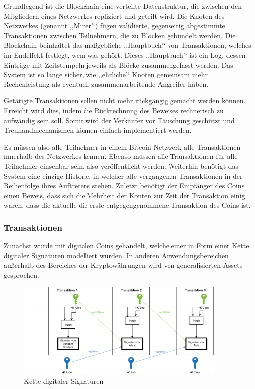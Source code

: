     \noindent Grundlegend ist die Blockchain eine verteilte Datenstruktur, die zwischen den Mitgliedern eines Netzwerkes repliziert und geteilt wird\cite{Christidis2016}.
    Die Knoten des Netzwerkes (genannt ,,Miner'`) fügen validierte, gegenseitig abgestimmte Transaktionen zwischen Teilnehmern, die zu Blöcken gebündelt werden.
    Die Blockchain beinhaltet das maßgebliche ,,Hauptbuch'` von Transaktionen, welches im Endeffekt festlegt, wem was gehört.
    Dieses ,,Hauptbuch'` ist ein Log, dessen Einträge mit Zeitstempeln jeweils als Blöcke zusammengefasst werden.
    Das System ist so lange sicher, wie ,,ehrliche'` Knoten gemeinsam mehr Rechenleistung als eventuell zusammenarbeitende Angreifer haben\cite{Nakamoto2008}.
    
    
    Getätigte Transaktionen sollen nicht mehr rückgängig gemacht werden können.
    Erreicht wird dies, indem die Rückrechnung des Beweises rechnerisch zu aufwändig sein soll\cite{Nakamoto2008}.
    Somit wird der Verkäufer vor Täuschung geschützt und Treuhandmechanismen können einfach implementiert werden\cite{Nakamoto2008}.  
    
    Es müssen also alle Teilnehmer in einem Bitcoin-Netzwerk alle Transaktionen innerhalb des Netzwerkes kennen.
    Ebenso müssen alle Transaktionen für alle Teilnehmer einsehbar sein, also veröffentlicht werden.
    Weiterhin benötigt das System eine einzige Historie, in welcher alle vergangenen Transaktionen in der Reihenfolge ihres Auftretens stehen.
    Zuletzt benötigt der Empfänger des Coins einen Beweis, dass sich die Mehrheit der Konten zur Zeit der Transaktion einig waren, dass die aktuelle die erste entgegengenommene Transaktion des Coins ist. 
    \cite{Nakamoto2008}
    
    
    \subsubsection{Transaktionen}
    \label{sec:sota_blockchain_trx}
	    Zunächst wurde mit digitalen Coins gehandelt, welche einer in Form einer Kette digitaler Signaturen modelliert wurden\cite{Nakamoto2008}.
	    In anderen Anwendungsbereichen außerhalb des Bereiches der Kryptowährungen wird von generalisierten Assets gesprochen.
	    \begin{figure}[H]
	    	\centering
	    	\includegraphics[width=0.9\textwidth]{graphics/transaction.png}
	    	\caption{Kette digitaler Signaturen}
	    	\label{fig:txio}
	    \end{figure}
    

